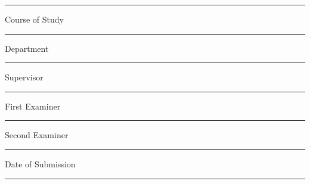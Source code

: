 {\begin{titlepage}
			\noindent\rule{15cm}{0.4pt}
			
			\vskip 0.05cm

			\begingroup
			\fontsize{8pt}{6pt}\selectfont
			Course of Study
			\endgroup

			\vskip -0.15cm

			\begingroup
			\fontsize{12pt}{14pt}\selectfont
				{\@courseOfStudies}
			\endgroup
			\vskip -0.15cm

			\noindent\rule{15cm}{0.4pt}
			
			\vskip 0.05cm

			\begingroup
			\fontsize{8pt}{6pt}\selectfont
			Department
			\endgroup

			\vskip -0.15cm

			\begingroup
			\fontsize{12pt}{14pt}\selectfont
				{\@discipline}
			\endgroup
			\vskip -0.15cm

			\noindent\rule{15cm}{0.4pt}
			
			\vskip 0.05cm
			
			\begingroup
			\fontsize{8pt}{6pt}\selectfont
			Supervisor
			\endgroup

			\vskip -0.15cm

			\begingroup
			\fontsize{12pt}{14pt}\selectfont
				{\@supervisor}
			\endgroup
			\vskip -0.15cm

			\noindent\rule{15cm}{0.4pt}
			
			\vskip 0.05cm
			\begingroup
			\fontsize{8pt}{6pt}\selectfont
			First Examiner
			\endgroup

			\vskip -0.15cm

			\begingroup
			\fontsize{12pt}{14pt}\selectfont
				{\@firstExaminer}
			\endgroup
			\vskip -0.15cm

			\noindent\rule{15cm}{0.4pt}
			
			\vskip 0.05cm

			\begingroup
			\fontsize{8pt}{6pt}\selectfont
			Second Examiner
			\endgroup

			\vskip -0.15cm

			\begingroup
			\fontsize{12pt}{14pt}\selectfont
				{\@secondExaminer}
			\endgroup
			\vskip -0.15cm

			\noindent\rule{15cm}{0.4pt}
			
			\vskip 0.05cm

			\begingroup
			\fontsize{8pt}{6pt}\selectfont
			Date of Submission
			\endgroup

			\vskip -0.15cm

			\begingroup
			\fontsize{12pt}{14pt}\selectfont
				{\@submitDate}
			\endgroup
			\vskip -0.15cm

			\noindent\rule{15cm}{0.4pt}
		\restoregeometry
	\end{titlepage}
}
\makeatother
